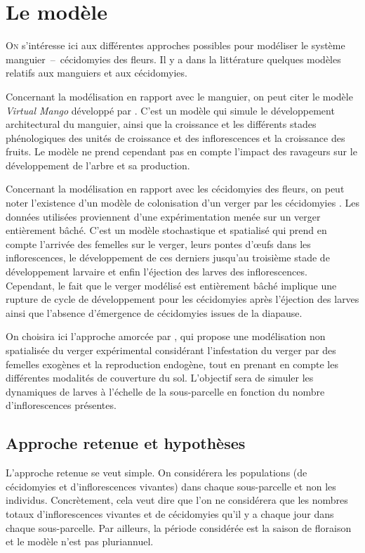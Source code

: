 \chapter{Le modèle}

\lettrine{O}{n} s'intéresse ici aux différentes approches possibles pour modéliser le système manguier~--~cécidomyies des fleurs. 
Il y a dans la littérature quelques modèles relatifs aux manguiers et aux cécidomyies.

Concernant la modélisation en rapport avec le manguier, on peut citer le modèle \emph{Virtual Mango} développé par \citet{fred}.
C'est un modèle qui simule le développement architectural du manguier, ainsi que la croissance et les différents stades phénologiques des unités de croissance et des inflorescences et la croissance des fruits.
Le modèle ne prend cependant pas en compte l'impact des ravageurs sur le développement de l'arbre et sa production.

Concernant la modélisation en rapport avec les cécidomyies des fleurs, on peut noter l'existence d'un modèle de colonisation d'un verger par les cécidomyies \citep{paul}. 
Les données utilisées proviennent d'une expérimentation menée sur un verger entièrement bâché. 
C'est un modèle stochastique et spatialisé qui prend en compte l'arrivée des femelles sur le verger, leurs pontes d'œufs dans les inflorescences, le développement de ces derniers jusqu'au troisième stade de développement larvaire et enfin l'éjection des larves des inflorescences.
Cependant, le fait que le verger modélisé est entièrement bâché implique une rupture de cycle de développement pour les cécidomyies après l'éjection des larves ainsi que l'absence d'émergence de cécidomyies issues de la diapause.

On choisira ici l'approche amorcée par \citet{laurie}, qui propose une modélisation non spatialisée du verger expérimental considérant l'infestation du verger par des femelles exogènes et la reproduction endogène, tout en prenant en compte les différentes modalités de couverture du sol.
L'objectif sera de simuler les dynamiques de larves à l'échelle de la sous-parcelle en fonction du nombre d'inflorescences présentes.

\section{Approche retenue et hypothèses}

L'approche retenue se veut simple.
On considérera les populations (de cécidomyies et d'inflorescences vivantes) dans chaque sous-parcelle et non les individus.
Concrètement, cela veut dire que l'on ne considérera que les nombres totaux d'inflorescences vivantes et de cécidomyies qu'il y a chaque jour dans chaque sous-parcelle.
Par ailleurs, la période considérée est la saison de floraison et le modèle n'est pas pluriannuel.

